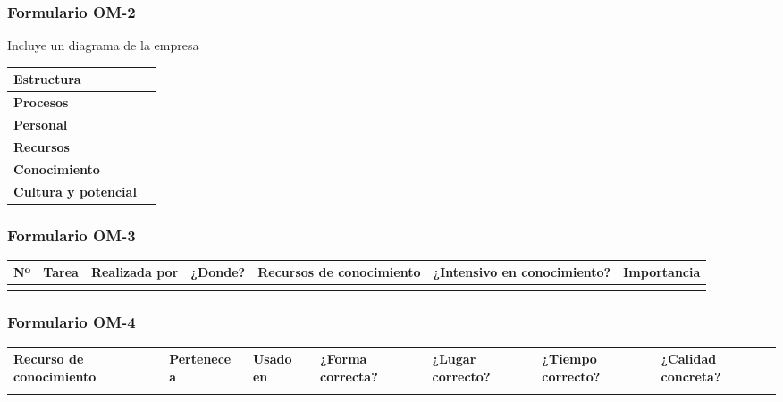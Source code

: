 \documentclass[a4paper,11pt]{article}
\begin{document}
			\subsubsection{Formulario OM-2}
			Incluye un diagrama de la empresa
			\begin{center}
				\begin{tabular}{| l | l |}
					\hline
					\textbf{Estructura} & \\
					\hline
					\textbf{Procesos} & \\
					\hline
					\textbf{Personal} & \\
					\hline
					\textbf{Recursos} & \\
					\hline
					\textbf{Conocimiento} & \\
					\hline
					\textbf{Cultura y potencial} & \\
					\hline
				\end{tabular}
			\end{center}
			\newpage
			\begin{landscape}
			\subsubsection{Formulario OM-3}
			\begin{center}
				\begin{tabular}{| l | l | p{2.8cm} | p{2cm} | p{5cm} | p{3cm} | p{2.5cm} |}
					\hline
					\textbf{Nº} & \textbf{Tarea} & \textbf{Realizada por} & \textbf{¿Donde?} & \textbf{Recursos de conocimiento} &
					\textbf{¿Intensivo en conocimiento?} & \textbf{Importancia}\\
					\hline
					 & & & & & &\\
					\hline
				\end{tabular}
			\end{center}
			\end{landscape}
			\newpage
			\begin{landscape}
			\subsubsection{Formulario OM-4}
			\begin{center}
				\begin{tabular}{| p{5cm} | p{2.4cm} | p{2cm} | p{2cm} | p{2cm} | p{2cm} |
				p{2cm} |}
					\hline
					\textbf{Recurso de conocimiento} & \textbf{Pertenece a} & \textbf{Usado en} & \textbf{¿Forma correcta?} & \textbf{¿Lugar correcto?} &
					\textbf{¿Tiempo correcto?} & \textbf{¿Calidad concreta?}\\
					\hline
					 & & & & & &\\
					\hline
				\end{tabular}
			\end{center}
			\end{landscape}
\end{document}
